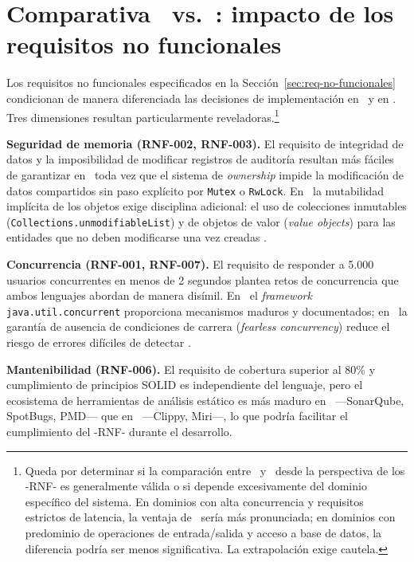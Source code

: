 \section{Comparativa \java\ vs.\ \rust: impacto de los requisitos no funcionales}
\label{sec:java-rust-requisitos}

Los requisitos no funcionales especificados en la Sección~\ref{sec:req-no-funcionales}
condicionan de manera diferenciada las decisiones de implementación en
\java\ y en \rust. Tres dimensiones resultan particularmente reveladoras.\footnote{%
  Queda por determinar si la comparación entre \java\ y \rust\ desde la
  perspectiva de los -RNF- es generalmente válida o si depende
  excesivamente del dominio específico del sistema. En dominios con alta
  concurrencia y requisitos estrictos de latencia, la ventaja de \rust\
  sería más pronunciada; en dominios con predominio de operaciones
  de entrada/salida y acceso a base de datos, la diferencia podría ser
  menos significativa. La extrapolación exige cautela.}

\textbf{Seguridad de memoria (RNF-002, RNF-003).} El requisito de
integridad de datos y la imposibilidad de modificar registros de auditoría
resultan más fáciles de garantizar en \rust\, toda vez que el sistema
de \textit{ownership} impide la modificación de datos compartidos sin
paso explícito por \texttt{Mutex} o \texttt{RwLock}. En \java\, la
mutabilidad implícita de los objetos exige disciplina adicional: el
uso de colecciones inmutables (\texttt{Collections.unmodifiableList})
y de objetos de valor (\textit{value objects}) para las entidades
que no deben modificarse una vez creadas \autocite{Bloch2018}.

\textbf{Concurrencia (RNF-001, RNF-007).} El requisito de responder a
5.000 usuarios concurrentes en menos de 2 segundos plantea retos de
concurrencia que ambos lenguajes abordan de manera disímil. En \java\,
el \textit{framework} \texttt{java.util.concurrent} proporciona
mecanismos maduros y documentados; en \rust\, la garantía de ausencia
de condiciones de carrera (\textit{fearless concurrency}) reduce
el riesgo de errores difíciles de detectar \autocite{Klabnik2023}.

\textbf{Mantenibilidad (RNF-006).} El requisito de cobertura superior
al 80\% y cumplimiento de principios SOLID es independiente del lenguaje,
pero el ecosistema de herramientas de análisis estático es más maduro
en \java\ ---SonarQube, SpotBugs, PMD--- que en \rust\ ---Clippy, Miri---,
lo que podría facilitar el cumplimiento del -RNF- durante el desarrollo.

